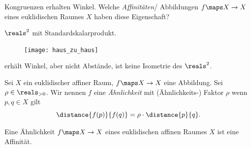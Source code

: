 \begin{frage*}
  Kongruenzen erhalten Winkel. Welche \emph{Affinitäten}/ Abbildungen \( f\maps X\to X \) eines euklidischen Raumes \( X \) haben diese Eigenschaft?
\end{frage*}
\begin{beispiel*}
  \( \reals^2 \) mit Standardskalarprodukt.
  \begin{figure}[H]
    \centering
    \texttt{[image: haus\_zu\_haus]}
    \label{fig:haus_zu_haus}
  \end{figure}
  erhält Winkel, aber nicht Abstände, \dh ist keine Isometrie des \( \reals^2 \).
\end{beispiel*}
\begin{definition*}
  Sei \( X \) ein euklidischer affiner Raum, \( f\maps X\to X \) eine Abbildung. Sei \( \rho\in \reals_{>0} \). Wir nennen \( f  \) eine \emph{Ähnlichkeit} mit (Ähnlichkeits-) Faktor \( \rho \) wenn \tforall  \( p,q\in X \) gilt
  \begin{equation*}
    \distance{f(p)}{f(q)}=\rho\cdot \distance{p}{q}.
  \end{equation*}
\end{definition*}
\begin{korollar*}
  Eine Ähnlichkeit \( f\maps X\to X \) eines euklidischen affinen Raumes \( X \) ist eine Affinität.
\end{korollar*}
